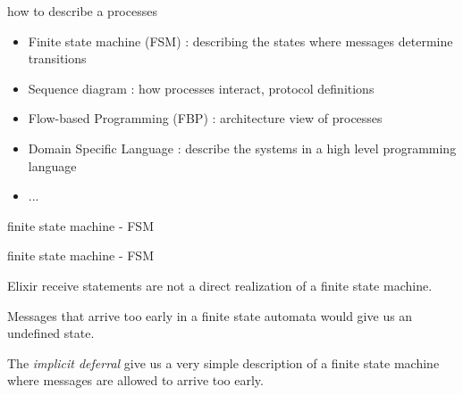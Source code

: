 \begin{frame}{how to describe a processes}

  \begin{itemize}
  \item Finite state machine (FSM) : describing the states where messages determine transitions \pause 
  \item Sequence diagram : how processes interact, protocol definitions \pause
  \item Flow-based Programming (FBP) : architecture view of processes
  \item Domain Specific Language : describe the systems in a high level programming language \pause
  \item  ... 
  \end{itemize}
  
\end{frame}



\begin{frame}{finite state machine - FSM}




\end{frame}


\begin{frame}{finite state machine - FSM}

Elixir receive statements are not a direct realization of a finite state machine.

\pause\vspace{10pt}

Messages that arrive too early in a finite state automata would give us an undefined state.

\pause\vspace{10pt}

The {\em implicit deferral} give us a very simple description of a
finite state machine where  messages are allowed to arrive too
early.


\end{frame}


